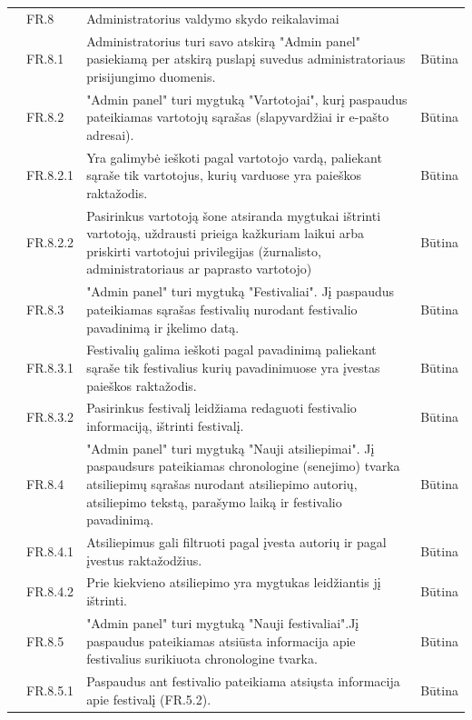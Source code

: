 \documentclass{VUMIFPSkursinis}
\begin{document}
\begin{longtable}{|p{1cm}|p{3cm}|p{9cm}|c|}
 & \cellcolor{light-gray} FR.8 & \multicolumn{2}{l|}{ \cellcolor{light-gray}Administratorius valdymo skydo reikalavimai} \\ \cline{2-4} 
 & FR.8.1 & Administratorius turi savo atskirą "Admin panel" pasiekiamą per atskirą puslapį suvedus administratoriaus prisijungimo duomenis. & Būtina \\ \cline{2-4} 
 & FR.8.2 & "Admin panel" turi mygtuką "Vartotojai", kurį paspaudus pateikiamas vartotojų sąrašas (slapyvardžiai ir e-pašto adresai). & Būtina \\ \cline{2-4} 
 & FR.8.2.1 & Yra galimybė ieškoti pagal vartotojo vardą, paliekant sąraše tik vartotojus, kurių varduose yra paieškos raktažodis. & Būtina \\ \cline{2-4} 
 & FR.8.2.2 & Pasirinkus vartotoją šone atsiranda mygtukai ištrinti vartotoją, uždrausti prieiga kažkuriam laikui arba priskirti vartotojui privilegijas (žurnalisto, administratoriaus ar paprasto vartotojo) & Būtina \\ \cline{2-4} 
 & FR.8.3 & "Admin panel" turi mygtuką "Festivaliai". Jį paspaudus pateikiamas sąrašas festivalių nurodant festivalio pavadinimą ir įkelimo datą. & Būtina \\ \cline{2-4} 
 & FR.8.3.1 & Festivalių galima ieškoti pagal pavadinimą paliekant sąraše tik festivalius kurių pavadinimuose yra įvestas paieškos raktažodis. & Būtina \\ \cline{2-4} 
 & FR.8.3.2 & Pasirinkus festivalį leidžiama redaguoti festivalio informaciją, ištrinti festivalį. & Būtina \\ \cline{2-4} 
 & FR.8.4 & "Admin panel" turi mygtuką "Nauji atsiliepimai". Jį paspaudsurs pateikiamas chronologine (senejimo) tvarka atsiliepimų sąrašas nurodant atsiliepimo autorių, atsiliepimo tekstą, parašymo laiką ir festivalio pavadinimą. & Būtina \\ \cline{2-4} 
 & FR.8.4.1 & Atsiliepimus gali filtruoti pagal įvesta autorių ir pagal įvestus raktažodžius. & Būtina \\ \cline{2-4} 
 & FR.8.4.2 & Prie kiekvieno atsiliepimo yra mygtukas leidžiantis jį ištrinti. & Būtina \\ \cline{2-4} 
 & FR.8.5 & "Admin panel" turi mygtuką "Nauji festivaliai".Jį paspaudus pateikiamas atsiūsta informacija apie festivalius surikiuota chronologine tvarka. & Būtina \\ \cline{2-4} 
 & FR.8.5.1 & Paspaudus ant festivalio pateikiama atsiųsta informacija apie festivalį (FR.5.2). & Būtina \\ \cline{2-4} 

\end{longtable}
\end{document}
